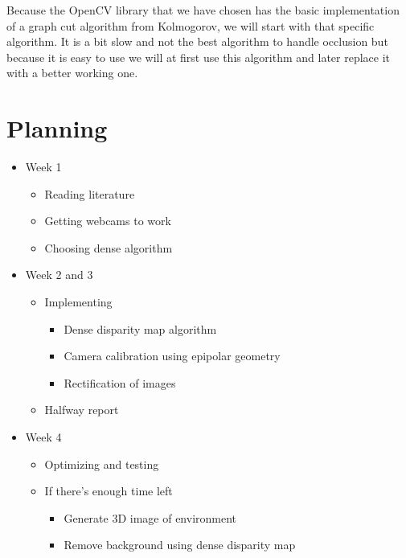 \documentclass[a4paper]{article}
\begin{document}
Because the OpenCV library that we have chosen has the basic
implementation of a graph cut algorithm from Kolmogorov, we will start with
that specific algorithm.
It is a bit slow and not the best algorithm to handle occlusion but because it is
easy to use we will at first use this algorithm and later replace it
with a better working one.

\newpage
\section{Planning}
\begin{itemize}
  \item Week 1
    \begin{itemize}
      \item Reading literature
      \item Getting webcams to work
      \item Choosing dense algorithm
    \end{itemize}
  \item Week 2 and 3
    \begin{itemize}
      \item Implementing
        \begin{itemize}
          \item Dense disparity map algorithm
          \item Camera calibration using epipolar geometry
          \item Rectification of images
        \end{itemize}
      \item Halfway report
    \end{itemize}
  \item Week 4
    \begin{itemize}
      \item Optimizing and testing
      \item If there's enough time left
        \begin{itemize}
          \item Generate 3D image of environment
          \item Remove background using dense disparity map
        \end{itemize}
    \end{itemize}
\end{itemize}
\end{document}
